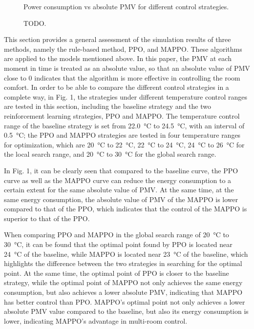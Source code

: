\documentclass[preprint,12pt]{elsarticle}
\newcommand{\figurestorepath}{../packages/hvacmarl6e43_notebooks/__datastore__}
\begin{document}
\begin{figure}[H]
    \centering
    \caption{Power consumption vs absolute PMV for different control strategies.}
\end{figure}

\begin{figure}[H]
    \centering
    \caption{TODO.}
\end{figure}

This section provides a general assessment of the simulation results of three methods, 
namely the rule-based method, PPO, and MAPPO. These algorithms are applied to the models mentioned above. 
In this paper, the PMV at each moment in time is treated as an absolute value, 
so that an absolute value of PMV close to 0 indicates that the algorithm is more effective in controlling the room comfort. 
In order to be able to compare the different control strategies in a complete way, 
in Fig. 1, the strategies under different temperature control ranges are tested in this section, 
including the baseline strategy and the two reinforcement learning strategies, PPO and MAPPO. 
The temperature control range of the baseline strategy is set from 22.\SI{0}{\celsius} to 24.\SI{5}{\celsius}, with an interval of 0.\SI{5}{\celsius}; 
the PPO and MAPPO strategies are tested in four temperature ranges for optimization, 
which are \SI{20}{\celsius} to \SI{22}{\celsius}, \SI{22}{\celsius} to \SI{24}{\celsius}, \SI{24}{\celsius} to \SI{26}{\celsius} for the local search range, 
and \SI{20}{\celsius} to \SI{30}{\celsius} for the global search range. 

In Fig. 1, it can be clearly seen that compared to the baseline curve, 
the PPO curve as well as the MAPPO curve can reduce the energy consumption to a certain extent for the same absolute value of PMV. 
At the same time, at the same energy consumption, the absolute value of PMV of the MAPPO is lower compared to that of the PPO, 
which indicates that the control of the MAPPO is superior to that of the PPO. 

When comparing PPO and MAPPO in the global search range of \SI{20}{\celsius} to \SI{30}{\celsius}, 
it can be found that the optimal point found by PPO is located near \SI{24}{\celsius} of the baseline, 
while MAPPO is located near \SI{23}{\celsius} of the baseline, 
which highlights the difference between the two strategies in searching for the optimal point. 
At the same time, the optimal point of PPO is closer to the baseline strategy, 
while the optimal point of MAPPO not only achieves the same energy consumption, 
but also achieves a lower absolute PMV, indicating that MAPPO has better control than PPO. 
MAPPO's optimal point not only achieves a lower absolute PMV value compared to the baseline, 
but also its energy consumption is lower, indicating MAPPO's advantage in multi-room control. 
\end{document}

